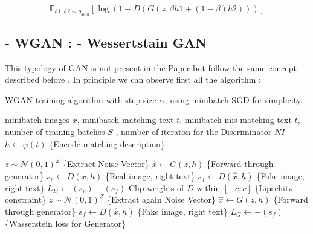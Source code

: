 \begin{equation}
    \mathbb{E}_{h1,h2 \sim p_{data} } [\log( 1 - D(G( z , \beta h1 + 
    (1-\beta) h2 )))]
\end{equation}

\subsection*{- WGAN : - Wessertstain GAN}
This typology of GAN is not present in the Paper but follow the same concept 
described before . 
In principle we can observe first all the algorithm :

\begin{algorithm}
    \caption{WGAN training algorithm with step size $\alpha$, using minibatch SGD for simplicity.}
    \label{alg:WGAN}
    \begin{algorithmic}
        \Require minibatch images $x$, minibatch matching text $t$, minibatch mis-matching text $\tilde{t}$, 
        number of training batches $S$ , number of iteraton for the Discriminator $NI$ 
            \State $h \leftarrow \varphi(t)$ \hfill \{Encode matching description\}
            
                \State $z \sim \mathcal{N}(0, 1)^Z$ \hfill \{Extract Noise Vector\}
                \State $\hat{x} \leftarrow G(z, h)$ \hfill \{Forward through generator\}
                \State $s_r \leftarrow D(x, h)$ \hfill \{Real image, right text\}
                \State $s_f \leftarrow D(\hat{x}, h)$ \hfill \{Fake image, right text\}
                \State $L_D \leftarrow (s_r) - (s_f) $
                \State Clip weights of $D$ within $[-c, c]$
                \State \{Lipschitz constraint\}
            \EndFor
            \State $z \sim \mathcal{N}(0, 1)^Z$ \hfill \{Extract again Noise Vector\}
            \State $\hat{x} \leftarrow G(z, h)$ \hfill \{Forward through generator\}
            \State $s_f \leftarrow D(\hat{x}, h)$ \hfill \{Fake image, right text\}
            \State $L_G \leftarrow -(s_f) $ \hfill \{Wasserstein loss for Generator\}
            \EndFor
    \end{algorithmic}
\end{algorithm}

